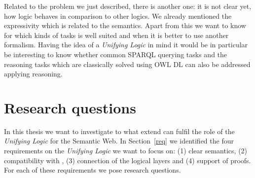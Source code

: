 Related to the problem we just described, there is another one: it is not clear yet, how \nthree logic behaves in comparison to other logics. 
We already mentioned the expressivity which is related to the semantics. 
Apart from this we want to know for which kinds of tasks \nthreelogic is well suited 
and when it is better to use another formalism. Having the idea of a \emph{Unifying Logic} in mind it would be in particular be interesting to 
know whether common SPARQL querying tasks 
and the reasoning tasks which are classically solved using OWL DL can also be addressed applying \nthree reasoning.

%
% 
% 
% 
% 
% 
% 
% 
%  

\section{Research questions}\label{researchquestions}
In this thesis we want to investigate to what extend \nthreelogic can fulfil the role of the \emph{Unifying Logic} for the Semantic Web.
In Section~\ref{req} we identified the four requirements on the \emph{Unifying Logic} we want to focus on: (1) clear semantics, %
(2) compatibility with \rdf, 
(3) connection of the logical layers 
and (4) support of proofs. For each of these requirements we pose research questions.



